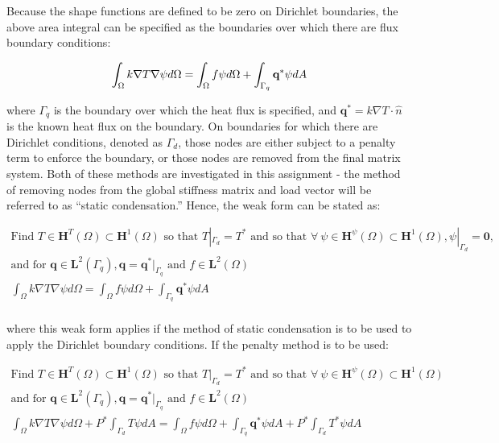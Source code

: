 \documentclass[10pt]{article}
\begin{document}
Because the shape functions are defined to be zero on Dirichlet boundaries, the above area integral can be specified as the boundaries over which there are flux boundary conditions:

\begin{equation}
\int_{\Omega}k\nabla T\nabla\psi d\Omega=\int_{\Omega}f\psi d\Omega+\int_{\Gamma_q}\textbf{q}^{*}\psi dA\\
\end{equation}

where \(\Gamma_q\) is the boundary over which the heat flux is specified, and \(\textbf{q}^{*}=k\nabla T\cdot\hat{n}\) is the known heat flux on the boundary. On boundaries for which there are Dirichlet conditions, denoted as \(\Gamma_d\), those nodes are either subject to a penalty term to enforce the boundary, or those nodes are removed from the final matrix system. Both of these methods are investigated in this assignment - the method of removing nodes from the global stiffness matrix and load vector will be referred to as ``static condensation.'' Hence, the weak form can be stated as:

\begin{tcolorbox}
\begin{equation}
\label{eq:WeakFormQ1}
\begin{aligned}
\text{Find }T\in \textbf{H}^T(\Omega)\subset \textbf{H}^1(\Omega) \text{ so that } T|_{\Gamma_d}=T^{*} \text{ and so that }\forall\ \psi \in \textbf{H}^\psi(\Omega)\subset \textbf{H}^1(\Omega), \psi|_{\Gamma_d}=\textbf{0},\\
\text{and for }\textbf{q}\in\textbf{L}^2(\Gamma_q), \textbf{q}=\textbf{q}^{*}|_{\Gamma_q}\text{ and }f\in\textbf{L}^2(\Omega)\\
\int_{\Omega}k\nabla T\nabla\psi d\Omega=\int_{\Omega}f\psi d\Omega+\int_{\Gamma_q}\textbf{q}^{*}\psi dA\\
\end{aligned}
\end{equation}
\end{tcolorbox}

where this weak form applies if the method of static condensation is to be used to apply the Dirichlet boundary conditions. If the penalty method is to be used:

\begin{tcolorbox}
\begin{equation}
\label{eq:WeakFormQ2}
\begin{aligned}
\text{Find }T\in \textbf{H}^T(\Omega)\subset \textbf{H}^1(\Omega) \text{ so that } T|_{\Gamma_d}=T^{*} \text{ and so that }\forall\ \psi \in \textbf{H}^\psi(\Omega)\subset \textbf{H}^1(\Omega)\\
\text{and for }\textbf{q}\in\textbf{L}^2(\Gamma_q), \textbf{q}=\textbf{q}^{*}|_{\Gamma_q}\text{ and }f\in\textbf{L}^2(\Omega)\\
\int_{\Omega}k\nabla T\nabla\psi d\Omega+P^{*}\int_{\Gamma_d}T\psi dA=\int_{\Omega}f\psi d\Omega+\int_{\Gamma_q}\textbf{q}^{*}\psi dA+P^{*}\int_{\Gamma_d}T^{*}\psi dA\\
\end{aligned}
\end{equation}
\end{tcolorbox}
\end{document}
